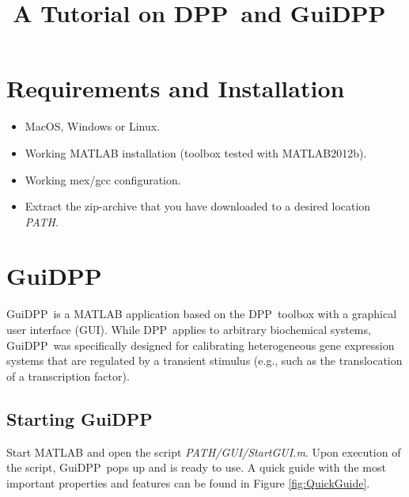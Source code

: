 \documentclass[a4paper, 9pt]{scrartcl}
\begin{document}


\def\DPP{DPP~}
\def\GuiDPP{GuiDPP~}

\title{A Tutorial on \DPP and \GuiDPP}
\date{}
\maketitle



\tableofcontents

\newpage

\section{Requirements and Installation}

\begin{itemize}
	\item MacOS, Windows or Linux.
	\item Working MATLAB installation (toolbox tested with MATLAB2012b).
	\item Working mex/gcc configuration.
	\item Extract the zip-archive that you have downloaded to a desired location \textit{PATH}. 
\end{itemize}

\section{\GuiDPP}

\GuiDPP is a MATLAB application based on the \DPP toolbox with a graphical user interface (GUI). While \DPP applies to arbitrary biochemical systems, \GuiDPP was specifically designed for calibrating heterogeneous gene expression systems that are regulated by a transient stimulus (e.g., such as the translocation of a transcription factor).

\subsection{Starting \GuiDPP}

Start MATLAB and open the script \textit{PATH/GUI/StartGUI.m}. Upon execution of the script, \GuiDPP  pops up and is ready to use. A quick guide with the most important properties and features can be found in Figure \ref{fig:QuickGuide}.
\end{document}
